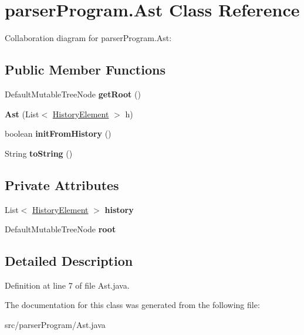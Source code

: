 \hypertarget{classparser_program_1_1_ast}{\section{parser\-Program.\-Ast Class Reference}
\label{classparser_program_1_1_ast}
}


Collaboration diagram for parser\-Program.\-Ast\-:
\subsection*{Public Member Functions}
\begin{DoxyCompactItemize}
\item 
\hypertarget{classparser_program_1_1_ast_af586bb4da64c79d9259c87757456d685}{Default\-Mutable\-Tree\-Node {\bfseries get\-Root} ()}\label{classparser_program_1_1_ast_af586bb4da64c79d9259c87757456d685}

\item 
\hypertarget{classparser_program_1_1_ast_a0dd9cc520a52069ec8d2bcccf7567799}{{\bfseries Ast} (List$<$ \hyperlink{classparser_program_1_1_history_element}{History\-Element} $>$ h)}\label{classparser_program_1_1_ast_a0dd9cc520a52069ec8d2bcccf7567799}

\item 
\hypertarget{classparser_program_1_1_ast_ad959cf65d00f25b4645d9ade0fb60410}{boolean {\bfseries init\-From\-History} ()}\label{classparser_program_1_1_ast_ad959cf65d00f25b4645d9ade0fb60410}

\item 
\hypertarget{classparser_program_1_1_ast_a58d8cf855d692e96d5af5d49a8bca4b9}{String {\bfseries to\-String} ()}\label{classparser_program_1_1_ast_a58d8cf855d692e96d5af5d49a8bca4b9}

\end{DoxyCompactItemize}
\subsection*{Private Attributes}
\begin{DoxyCompactItemize}
\item 
\hypertarget{classparser_program_1_1_ast_a565a13f94f478e998401f7abc25643aa}{List$<$ \hyperlink{classparser_program_1_1_history_element}{History\-Element} $>$ {\bfseries history}}\label{classparser_program_1_1_ast_a565a13f94f478e998401f7abc25643aa}

\item 
\hypertarget{classparser_program_1_1_ast_a004223ce41eed0c97a6fb63449b4b836}{Default\-Mutable\-Tree\-Node {\bfseries root}}\label{classparser_program_1_1_ast_a004223ce41eed0c97a6fb63449b4b836}

\end{DoxyCompactItemize}


\subsection{Detailed Description}


Definition at line 7 of file Ast.\-java.



The documentation for this class was generated from the following file\-:\begin{DoxyCompactItemize}
\item 
src/parser\-Program/Ast.\-java\end{DoxyCompactItemize}

